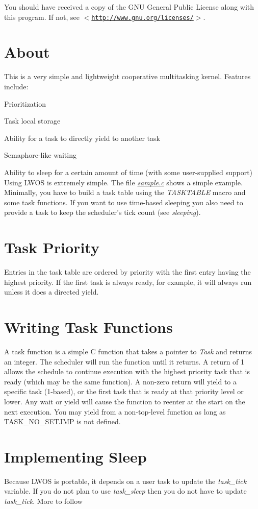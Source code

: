 \-You should have received a copy of the \-G\-N\-U \-General \-Public \-License along with this program. \-If not, see $<$\href{http://www.gnu.org/licenses/}{\tt http\-://www.\-gnu.\-org/licenses/}$>$.\hypertarget{index_about}{}\section{\-About}\label{index_about}
\-This is a very simple and lightweight cooperative multitasking kernel. \-Features include\-:
\begin{DoxyItemize}
\item \-Prioritization
\item \-Task local storage
\item \-Ability for a task to directly yield to another task
\item \-Semaphore-\/like waiting
\item \-Ability to sleep for a certain amount of time (with some user-\/supplied support) \-Using \-L\-W\-O\-S is extremely simple. \-The file {\itshape \hyperlink{sample_8c}{sample.\-c}\/} shows a simple example. \-Minimally, you have to build a task table using the {\itshape \-T\-A\-S\-K\-T\-A\-B\-L\-E\/} macro and some task functions. \-If you want to use time-\/based sleeping you also need to provide a task to keep the scheduler's tick count (see {\itshape sleeping\/}). 
\end{DoxyItemize}\hypertarget{index_priority}{}\section{\-Task Priority}\label{index_priority}
\-Entries in the task table are ordered by priority with the first entry having the highest priority. \-If the first task is always ready, for example, it will always run unless it does a directed yield. \hypertarget{index_func}{}\section{\-Writing Task Functions}\label{index_func}
\-A task function is a simple \-C function that takes a pointer to {\itshape \-Task\/} and returns an integer. \-The scheduler will run the function until it returns. \-A return of 1 allows the schedule to continue execution with the highest priority task that is ready (which may be the same function). \-A non-\/zero return will yield to a specific task (1-\/based), or the first task that is ready at that priority level or lower. \-Any wait or yield will cause the function to reenter at the start on the next execution. \-You may yield from a non-\/top-\/level function as long as \-T\-A\-S\-K\-\_\-\-N\-O\-\_\-\-S\-E\-T\-J\-M\-P is not defined. \hypertarget{index_sleeping}{}\section{\-Implementing Sleep}\label{index_sleeping}
\-Because \-L\-W\-O\-S is portable, it depends on a user task to update the {\itshape task\-\_\-tick\/} variable. \-If you do not plan to use {\itshape task\-\_\-sleep\/} then you do not have to update {\itshape task\-\_\-tick\/}. \-More to follow 